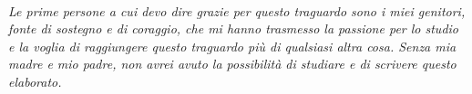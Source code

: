 ~\\
~\\
~\\
~\\
~\\
~\\
~\\
~\\
~\\
~\\
~\\
~\\
~\\
~\\
~\\
~\\
~\\
~\\
~\\
~\\
~\\
~\\
~\\
~\\
~\\
~\\
~\\
~\\
~\\
~\\
~\\
~\\
~\\
\begin{flushright}\emph{Le prime persone a cui devo dire grazie per questo traguardo sono i miei genitori, fonte di sostegno e di coraggio, che mi hanno trasmesso la passione per lo studio e la voglia di raggiungere questo traguardo più di qualsiasi altra cosa. Senza mia madre e mio padre, non avrei avuto la possibilità di studiare e di scrivere questo elaborato.}\end{flushright}